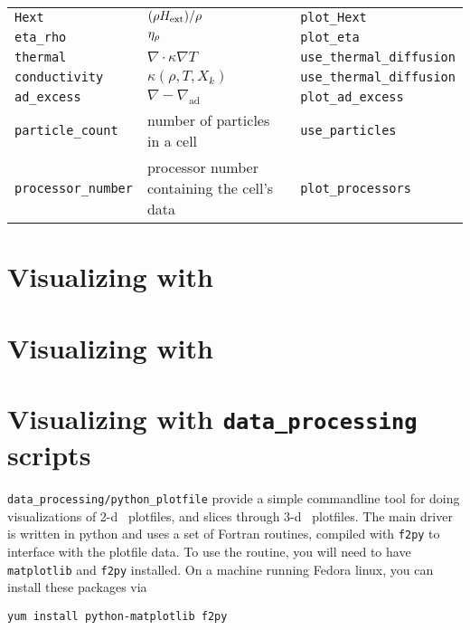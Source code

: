 {\begin{center}
\begin{longtable}{|l|p{2.25in}|p{2.5in}|}
{\tt Hext}             & $(\rho {H_{\rm ext}})/\rho$ & {\tt plot\_Hext} \\
{\tt eta\_rho}         & $\eta_{\rho}$ & {\tt plot\_eta} \\
{\tt thermal}          & $\nabla \cdot \kappa \nabla T$ & {\tt use\_thermal\_diffusion} \\
{\tt conductivity}     & $\kappa(\rho, T, X_k)$ & {\tt use\_thermal\_diffusion} \\
{\tt ad\_excess}       & $\nabla - \nabla_\mathrm{ad}$ & {\tt plot\_ad\_excess} \\
{\tt particle\_count}  & number of particles in a cell & {\tt use\_particles} \\
{\tt processor\_number} & processor number containing the cell's data & {\tt plot\_processors} \\
\end{longtable}
\end{center}
}

\renewcommand{\arraystretch}{1.0}


\section{Visualizing with \amrvis}


\section{Visualizing with \visit}


\section{Visualizing with {\tt data\_processing} scripts}
\label{sec:vis:python}

{\tt data\_processing/python\_plotfile} provide a simple commandline
tool for doing visualizations of 2-d \boxlib\ plotfiles, and slices
through 3-d \boxlib\ plotfiles.  The main driver is written in python
and uses a set of Fortran routines, compiled with {\tt f2py} to
interface with the plotfile data.  To use the routine, you will need
to have {\tt matplotlib} and {\tt f2py} installed.  On a machine
running Fedora linux, you can install these packages via
\begin{verbatim}
yum install python-matplotlib f2py
\end{verbatim}

